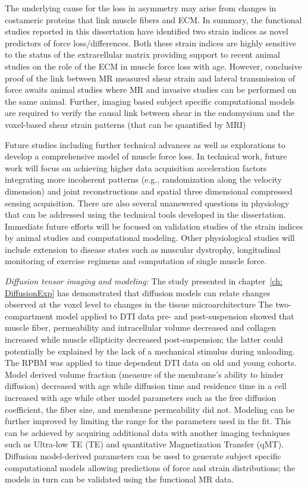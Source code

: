 The underlying cause for the loss in asymmetry may arise from changes in costameric proteins that link muscle fibers and ECM. 
In summary, the functional studies reported in this dissertation have identified two strain indices as novel predictors of force loss/differences. 
Both these strain indices are highly sensitive to the status of the extracellular matrix providing support to recent animal studies on the role of the ECM in muscle force loss with age. 
However, conclusive proof of the link between MR measured shear strain and lateral transmission of force awaits animal studies where MR and invasive studies can be performed on the same animal. 
Further, imaging based subject specific computational models are required to verify the causal link between shear in the endomysium and the voxel-based shear strain patterns (that can be quantified by MRI)

Future studies including further technical advances as well as explorations to develop a comprehensive model of muscle force loss. 
In technical work, future work will focus on achieving higher data acquisition acceleration factors integrating more incoherent patterns (e.g., randomization along the velocity dimension) and joint reconstructions and spatial three dimensional compressed sensing acquisition. 
There are also several unanswered questions in physiology that can be addressed using the technical tools developed in the dissertation. 
Immediate future efforts will be focused on validation studies of the strain indices by animal studies and computational modeling. 
Other physiological studies will include extension to disease states such as muscular dystrophy, longitudinal monitoring of exercise regimens and computation of single muscle force.

\textit{Diffusion tensor imaging and modeling:} The study presented in chapter~\ref{ch: DiffusionExp} has demonstrated that diffusion models can relate changes observed at the voxel level to changes in the tissue microarchitecture
The two-compartment model applied to DTI data pre- and post-suspension showed that muscle fiber, permeability and intracellular volume decreased and collagen increased while muscle ellipticity decreased post-suspension; the latter could potentially be explained by the lack of a mechanical stimulus during unloading. 
The RPBM was applied to time dependent DTI data on old and young cohorts.
Model derived volume fraction (measure of the membrane's ability to hinder diffusion) decreased with age while diffusion time and residence time in a cell increased with age while other model parameters such as the free diffusion coefficient, the fiber size, and membrane permeability did not.
Modeling can be further improved by limiting the range for the parameters used in the fit.
This can be achieved by acquiring additional data with another imaging techniques such as Ultra-low TE (TE) and quantitative Magnetization Transfer (qMT).
Diffusion model-derived parameters can be used to generate subject specific computational models allowing predictions of force and strain distributions; the models in turn can be validated using the functional MR data.

